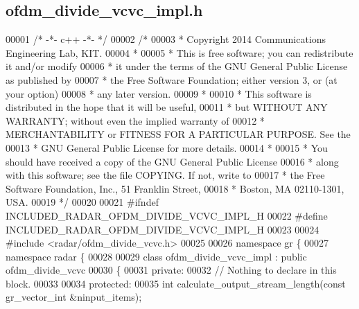 \subsection{ofdm\+\_\+divide\+\_\+vcvc\+\_\+impl.\+h}
\label{ofdm__divide__vcvc__impl_8h_source}

\begin{DoxyCode}
00001 \textcolor{comment}{/* -*- c++ -*- */}
00002 \textcolor{comment}{/* }
00003 \textcolor{comment}{ * Copyright 2014 Communications Engineering Lab, KIT.}
00004 \textcolor{comment}{ * }
00005 \textcolor{comment}{ * This is free software; you can redistribute it and/or modify}
00006 \textcolor{comment}{ * it under the terms of the GNU General Public License as published by}
00007 \textcolor{comment}{ * the Free Software Foundation; either version 3, or (at your option)}
00008 \textcolor{comment}{ * any later version.}
00009 \textcolor{comment}{ * }
00010 \textcolor{comment}{ * This software is distributed in the hope that it will be useful,}
00011 \textcolor{comment}{ * but WITHOUT ANY WARRANTY; without even the implied warranty of}
00012 \textcolor{comment}{ * MERCHANTABILITY or FITNESS FOR A PARTICULAR PURPOSE.  See the}
00013 \textcolor{comment}{ * GNU General Public License for more details.}
00014 \textcolor{comment}{ * }
00015 \textcolor{comment}{ * You should have received a copy of the GNU General Public License}
00016 \textcolor{comment}{ * along with this software; see the file COPYING.  If not, write to}
00017 \textcolor{comment}{ * the Free Software Foundation, Inc., 51 Franklin Street,}
00018 \textcolor{comment}{ * Boston, MA 02110-1301, USA.}
00019 \textcolor{comment}{ */}
00020 
00021 \textcolor{preprocessor}{#ifndef INCLUDED\_RADAR\_OFDM\_DIVIDE\_VCVC\_IMPL\_H}
00022 \textcolor{preprocessor}{#define INCLUDED\_RADAR\_OFDM\_DIVIDE\_VCVC\_IMPL\_H}
00023 
00024 \textcolor{preprocessor}{#include <radar/ofdm_divide_vcvc.h>}
00025 
00026 \textcolor{keyword}{namespace }gr \{
00027   \textcolor{keyword}{namespace }radar \{
00028 
00029     \textcolor{keyword}{class }ofdm_divide_vcvc_impl : \textcolor{keyword}{public} ofdm_divide_vcvc
00030     \{
00031      \textcolor{keyword}{private}:
00032       \textcolor{comment}{// Nothing to declare in this block.}
00033 
00034      \textcolor{keyword}{protected}:
00035       \textcolor{keywordtype}{int} calculate_output_stream_length(\textcolor{keyword}{const} gr\_vector\_int &ninput\_items);

\end{DoxyCode}
